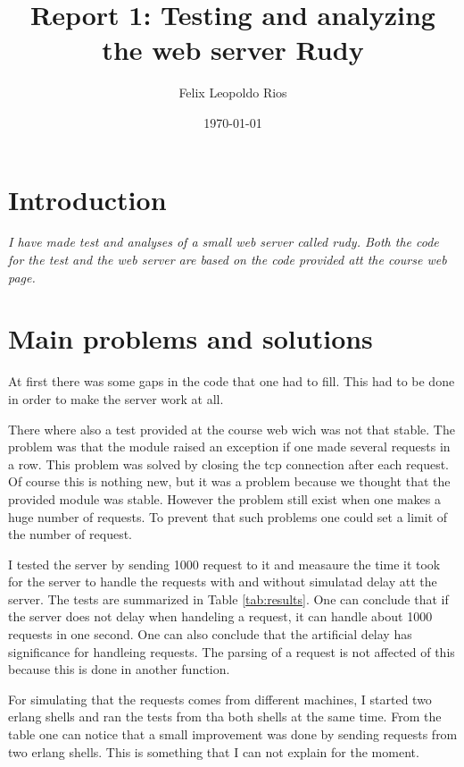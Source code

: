 \documentclass[a4paper, 11pt]{article}
\title{Report 1: Testing and analyzing the web server Rudy}
\author{Felix Leopoldo Rios}
\date{\today{}}
\begin{document}
\maketitle

\section{Introduction}

\textit{
I have made test and analyses of a small web server called rudy.
Both the code for the test and the web server are based on the code provided att the course web page.
}


\section{Main problems and solutions}

At first there was some gaps in the code that one had to fill.
This had to be done in order to make the server work at all.

There where also a test provided at the course web wich was not that stable.
The problem was that the module raised an exception if one made several requests in a row.
This problem was solved by closing the tcp connection after each request.
Of course this is nothing new, but it was a problem because we thought that the provided module was stable.
However the problem still exist when one makes a huge number of requests.
To prevent that such problems one could set a limit of the number of request.

I tested the server by sending 1000 request to it and measaure the time it took for the server to handle the requests with and without simulatad delay att the server.
The tests are summarized in Table \ref{tab:results}. 
One can conclude that if the server does not delay when handeling a request, it can handle about 1000 requests in one second.
One can also conclude that the artificial delay has significance for handleing requests. 
The parsing of a request is not affected of this because this is done in another function.

For simulating that the requests comes from different machines, I started two erlang shells and ran the tests from tha both shells at the same time.
From the table one can notice that a small improvement was done by sending requests from two erlang shells. 
This is something that I can not explain for the moment.
\end{document}
